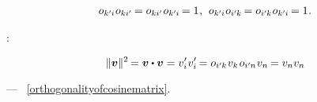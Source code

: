 {\nopagebreak\vspace{-0.2em}\begin{gather*}
\cosinematrix{k'\hspace{-0.1ex}i} \hspace{.1ex} \cosinematrix{ki'}
\hspace{-0.2ex}
= \cosinematrix{ki'} \hspace{.1ex} \cosinematrix{k'\hspace{-0.1ex}i} \hspace{-0.2ex}
= 1
\hspace{.1ex} ,
\hspace{.4em}
%
\cosinematrix{k'\hspace{-0.1ex}i} \hspace{.1ex} \cosinematrix{i'\hspace{-0.1ex}k} \hspace{-0.2ex}
= \cosinematrix{i'\hspace{-0.1ex}k} \hspace{.1ex} \cosinematrix{k'\hspace{-0.1ex}i} \hspace{-0.2ex}
= 1
\hspace{.1ex} .
\end{gather*}

:

\nopagebreak\vspace{-0.25em}\begin{equation*}
\|\bm{v}\|^2 \hspace{-0.22ex} = \bm{v} \dotp \bm{v}
= v'_i \hspace{.1ex} v'_i \hspace{-0.2ex}
= \cosinematrix{i'\hspace{-0.1ex}k} \hspace{.1ex} v_k \hspace{.2ex} \cosinematrix{i'\hspace{-0.1ex}n} \hspace{.1ex} v_n \hspace{-0.2ex}
= v_n v_n
\end{equation*}

\nopagebreak\vspace{-0.25em}\noindent
---  \textcolor{magenta}{}~\eqref{orthogonalityofcosinematrix}.

}
